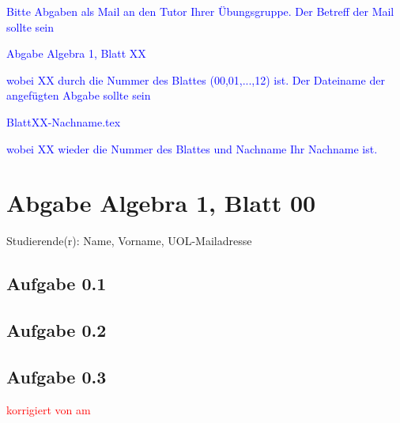 \documentclass[12pt]{article}
\newcommand{\corr}[1]{\textcolor{red}{#1}}%
\begin{document}
\textcolor{blue}{Bitte Abgaben als Mail an den Tutor Ihrer \"Ubungsgruppe. 
Der Betreff der Mail sollte sein   \\
\begin{center}
   Abgabe Algebra 1, Blatt XX  
\end{center}
wobei XX durch die Nummer des Blattes (00,01,...,12) ist. Der Dateiname der
angef\"ugten Abgabe sollte sein\\
\begin{center}
   BlattXX-Nachname.tex
\end{center}
wobei XX wieder die Nummer des Blattes und Nachname Ihr Nachname ist.}

\section*{Abgabe Algebra 1, Blatt 00}

Studierende(r): Name, Vorname, UOL-Mailadresse %

\subsection*{Aufgabe 0.1}  

\subsection*{Aufgabe 0.2}

\subsection*{Aufgabe 0.3}



\bigskip

\corr{korrigiert von \hspace{1cm} am }
\end{document}
